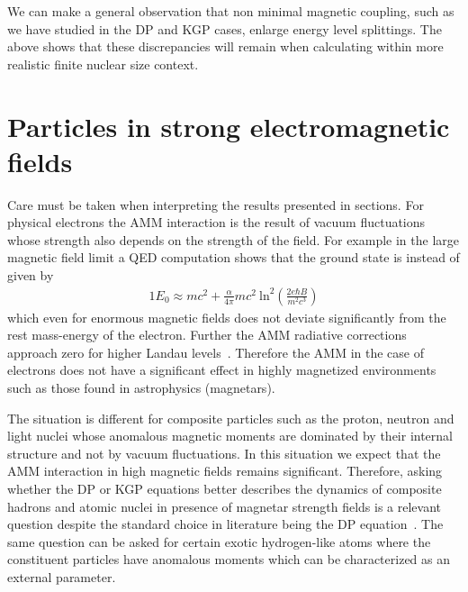 We can make a general observation that non minimal magnetic coupling, such as we have studied in the DP and KGP cases, enlarge energy level splittings. The above shows that these discrepancies will remain when calculating within more realistic finite nuclear size context.

















\section{Particles in strong electromagnetic fields}
\label{sec:sb}
Care must be taken when interpreting the results presented in sections. For physical electrons the AMM interaction is the result of vacuum fluctuations whose strength also depends on the strength of the field. For example in the large magnetic field limit a QED computation shows that the ground state is instead of  given by~\cite{Jancovici:1969exc}
\begin{alignat}{1} \label{vacfl01}
E_{0}\approx mc^{2}+\frac{\alpha}{4\pi}mc^{2}\ \mathrm{ln}^{2}\left(\frac{2e\hbar B}{m^{2}c^{3}}\right)
\end{alignat}
which even for enormous magnetic fields does not deviate significantly from the rest mass-energy of the electron. Further the AMM radiative corrections approach zero for higher Landau levels~\citep{Ferrer:2015wca,Hackebill:2022uxv}. Therefore the AMM in the case of electrons does not have a significant effect in highly magnetized environments such as those found in astrophysics (magnetars).

The situation is different for composite particles such as the proton, neutron and light nuclei whose anomalous magnetic moments are dominated by their internal structure and not by vacuum fluctuations. In this situation we expect that the AMM interaction in high magnetic fields remains significant. Therefore, asking whether the DP or KGP equations better describes the dynamics of composite hadrons and atomic nuclei in presence of magnetar strength fields is a relevant question despite the standard choice in literature being the DP equation~\citep{Broderick:2000pe}. The same question can be asked for certain exotic hydrogen-like atoms where the constituent particles have anomalous moments which can be characterized as an external parameter. 


